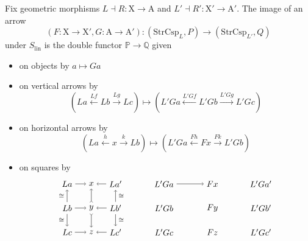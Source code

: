 \documentclass{amsart}
\newcommand{\lin}{_{\textrm{lin}}}
\newcommand{\iso}{\cong}
\newcommand{\A}{\cat{A}}
\newcommand{\X}{\cat{X}}
\newcommand{\PPP}{\dblcat{P}}
\newcommand{\QQQ}{\dblcat{Q}}
\newcommand{\StrCsp}{\cat{StrCsp}}
\newcommand{\cat}[1]{\mathrm{#1}}
\newcommand{\dblcat}[1]{\mathbb{#1}}
\newcommand{\from}{\colon}
\newcommand{\xto}[1]{\xrightarrow{#1}}
\newcommand{\xgets}[1]{\xleftarrow{#1}}
\theoremstyle{remark}
\theoremstyle{definition}
\begin{document}
Fix geometric morphisms $ L \dashv R \from \X \to \A $ and
$ L' \dashv R' \from \X' \to \A' $.  The image of an arrow
%
\[
  ( F \from \X \to \X' , G \from \A \to \A' ) \from
  ( \StrCsp_L , P ) \to ( \StrCsp_{L'} , Q )
\]
% 
under $ S\lin $ is the double functor $ \PPP \to \QQQ $ given
\begin{itemize}
\item on objects by $ a \mapsto Ga $
\item on vertical arrows by
  \[
    ( La \xgets{Lf} Lb \xto{Lg} Lc ) \mapsto
    ( L'Ga \xgets{L'Gf} L'Gb \xto{L'Gg} L'Gc )
  \]
\item on horizontal arrows by
  \[
    ( La \xgets{h} x \xto{k} Lb ) \mapsto
    ( L'Ga \xgets{Fh} Fx \xto{Fk} L'Gb )
  \]
\item on squares by
    \[
      \begin{tikzpicture}
        \begin{scope}
        \node (1) at (0,2) {\( La \)};
        \node (2) at (1,2) {\( x \)};
        \node (3) at (2,2) {\( La' \)};
        \node (4) at (0,1) {\( Lb \)};
        \node (5) at (1,1) {\( y \)};
        \node (6) at (2,1) {\( Lb' \)};
        \node (7) at (0,0) {\( Lc \)};
        \node (8) at (1,0) {\( z \)};
        \node (9) at (2,0) {\( Lc' \)};
        \draw [->] (1) to node [] {\scriptsize{\(  \)}} (2);
        \draw [->] (3) to node [] {\scriptsize{\(  \)}} (2);
        \draw [->] (4) to node [] {\scriptsize{\(  \)}} (5);
        \draw [->] (6) to node [] {\scriptsize{\(  \)}} (5);
        \draw [->] (7) to node [] {\scriptsize{\(  \)}} (8);
        \draw [->] (9) to node [] {\scriptsize{\(  \)}} (8);
        \draw [->] (4) to node [left] {\scriptsize{\( \iso \)}} (1);
        \draw [->] (4) to node [left] {\scriptsize{\( \iso \)}} (7);
        \draw [>->] (5) to node [] {\scriptsize{\(  \)}} (2);
        \draw [>->] (5) to node [] {\scriptsize{\(  \)}} (8);
        \draw [->] (6) to node [right] {\scriptsize{\( \iso \)}} (3);
        \draw [->] (6) to node [right] {\scriptsize{\( \iso \)}} (9);
      \end{scope}
      \begin{scope}[shift={(4,0)}]
        \node (1) at (0,2) {\( L'Ga \)};
        \node (2) at (2,2) {\( Fx \)};
        \node (3) at (4,2) {\( L'Ga' \)};
        \node (4) at (0,1) {\( L'Gb \)};
        \node (5) at (2,1) {\( Fy \)};
        \node (6) at (4,1) {\( L'Gb' \)};
        \node (7) at (0,0) {\( L'Gc \)};
        \node (8) at (2,0) {\( Fz \)};
        \node (9) at (4,0) {\( L'Gc' \)};
        \draw [->] (1) to node [] {\scriptsize{\(  \)}} (2);

\end{scope}
\end{tikzpicture}\]
\end{itemize}
\end{document}
